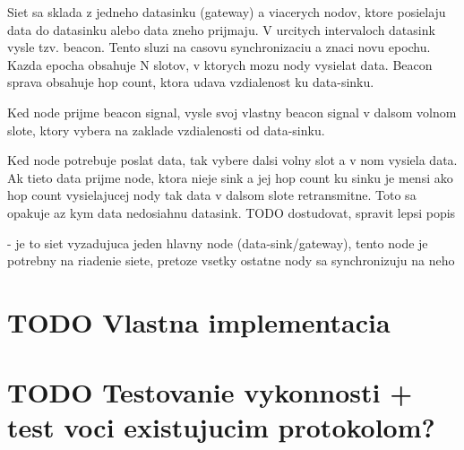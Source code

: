 \documentclass[czech,master]{diploma}
\begin{document}
Siet sa sklada z jedneho datasinku (gateway) a viacerych nodov, ktore posielaju data do datasinku alebo data zneho prijmaju.
V urcitych intervaloch datasink vysle tzv. beacon. Tento sluzi na casovu synchronizaciu a znaci novu epochu. Kazda epocha obsahuje N 
slotov, v ktorych mozu nody vysielat data. Beacon sprava obsahuje hop count, ktora udava vzdialenost ku data-sinku.

Ked node prijme beacon signal, vysle svoj vlastny beacon signal v dalsom volnom slote, ktory vybera na zaklade vzdialenosti od data-sinku.

Ked node potrebuje poslat data, tak vybere dalsi volny slot a v nom vysiela data. Ak tieto data prijme node, ktora nieje sink a jej hop count ku sinku je mensi ako hop count
vysielajucej nody tak data v dalsom slote retransmitne. Toto sa opakuje az kym data nedosiahnu datasink. TODO dostudovat, spravit lepsi popis

- je to siet vyzadujuca jeden hlavny node (data-sink/gateway), tento node je potrebny na riadenie siete, pretoze vsetky ostatne nody sa synchronizuju na neho



\chapter{TODO Vlastna implementacia}
\chapter{TODO Testovanie vykonnosti + test voci existujucim protokolom?}


\printbibliography[title={Literatura}, heading=bibintoc]

%
%

%
\end{document}
